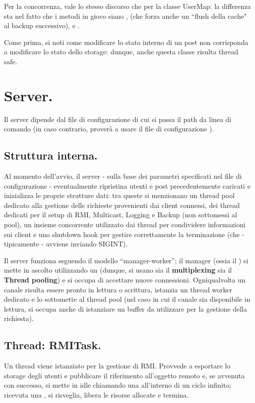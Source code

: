 \documentclass[11pt, italian, openany]{book}
\begin{document}
\begin{sloppypar}
\begin{itemize}[itemsep=0pt, parsep=0pt, topsep=0pt]
	Per la concorrenza, vale lo stesso discorso che per la classe UserMap: la differenza sta nel fatto che i metodi in gioco siano
	,  (che forza anche un ``flush della cache" al backup successivo),  e
	.

	Come prima, si noti come modificare lo stato interno di un post non corrisponda a modificare lo stato dello storage: dunque,
	anche questa classe risulta thread safe.
\end{itemize}


\section{Server.}
Il server dipende dal file di configurazione di cui si passa il path da linea di comando (in caso
contrario, prover\`a a usare il file di configurazione ).

\subsection*{Struttura interna.}
Al momento dell'avvio, il server - sulla base dei parametri specificati nel file di configurazione - eventualmente ripristina utenti e post
precedentemente caricati e inizializza le proprie strutture dati: tra queste si menzionano un thread pool dedicato alla gestione delle
richieste provenienti dai client connessi, dei thread dedicati per il setup di RMI, Multicast, Logging e Backup
(non sottomessi al pool), un insieme concorrente utilizzato dai thread per condividere informazioni sui client e uno shutdown hook per
gestire correttamente la terminazione (che - tipicamente - avviene inviando SIGINT).

Il server funziona seguendo il modello ``manager-worker''; il manager (ossia il ) si mette in ascolto utilizzando un
 (dunque, si usano sia il \textbf{multiplexing} sia il \textbf{Thread pooling}) e si occupa di accettare nuove connessioni.
Ogniqualvolta un canale risulta essere pronto in lettura o scrittura, istanzia un thread worker dedicato e lo sottomette al thread
pool (nel caso in cui il canale sia disponibile in lettura, si occupa anche di istanziare un buffer da utilizzare per la gestione
della richiesta).

\subsection*{Thread: RMITask.}
Un thread  viene istanziato per la gestione di RMI. Provvede a esportare lo storage degli utenti e pubblicare il riferimento
all'oggetto remoto e, se avvenuta con successo, si mette in idle chiamando una  all'interno di un ciclo infinito; ricevuta
una , si risveglia, libera le risorse allocate e termina.


\end{sloppypar}
\end{document}

